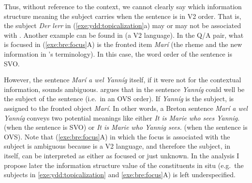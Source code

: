 \noindent Thus, without reference to the context, we cannot clearly
say which information structure meaning the subject carries when the
sentence is in V2 order. That is, the subject \textit{Der
  ler{\textschwa}r} in (\ref{exe:ydd:topicalization}a) may or may not
be associated with .  Another example can be found in
 (a V2 language). In the Q/A pair, what
is focused in (\ref{exe:bre:focus}A) is the fronted item
\textit{Mar\'i} (the rheme and the new information in
\citeauthor{press:86}'s terminology). In this case, the word order of the
sentence is SVO.


\noindent However, the sentence \textit{Mar\'i a wel Yann\'ig} itself,
if it were not for the contextual information, sounds
ambiguous. \citeauthor{press:86} argues that in the sentence
\textit{Yann\'ig} could well be the subject of the sentence (i.e.\ in
an OVS order). If \textit{Yann\'ig} is the subject,  is
assigned to the fronted object \textit{Mar\'i}. In other words, a
Breton sentence \textit{Mar\'i a wel Yann\'ig} conveys two potential
meanings like either \textit{It is Marie who sees Yannig.} (when the
sentence is SVO) or \textit{It is Marie who Yannig sees.} (when the
sentence is OVS).  Note that (\ref{exe:bre:focus}A) in which the focus
is associated with the subject is ambiguous because  is a
V2 language, and therefore the subject, in itself,
can be interpreted as either as focused or just unknown. In the
analysis I propose later the information structure value of the
constituents in situ (e.g.\ the subjects in
\ref{exe:ydd:topicalization} and \ref{exe:bre:focus}A) is left
underspecified.

